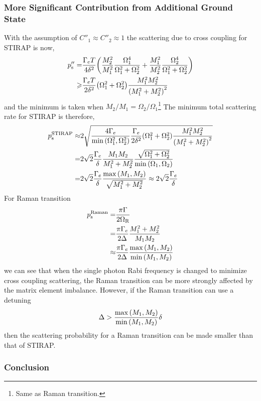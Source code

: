 \subsubsection{More Significant Contribution from Additional Ground State}
\label{ch:raman-transfer:stirap:raman-vs-stirap:cross-couple}

With the assumption of $C''_1\approx C''_2\approx1$ the scattering due to
cross coupling for STIRAP is now,
\begin{align*}
  p''_{\mathrm{s}}=&\frac{\Gamma_eT}{4\delta^2}{\left({\frac{M_2^2}{M_1^2}\frac{\Omega_1^4}{\Omega_1^2+\Omega_2^2}+\frac{M_1^2}{M_2^2}\frac{\Omega_2^4}{\Omega_1^2+\Omega_2^2}}\right)}\\
  \geqslant&\frac{\Gamma_eT}{2\delta^2}{\left({\Omega_1^2+\Omega_2^2}\right)}\frac{M_1^2M_2^2}{{\left({M_1^2+M_2^2}\right)}^2}
\end{align*}
and the minimum is taken when $M_2/M_1=\Omega_2/\Omega_1$\footnote{Same as Raman transition.}
The minimum total scattering rate for STIRAP is therefore,
\begin{align*}
  p_{\mathrm{s}}^{\mathrm{STIRAP}}\approx&2\sqrt{\frac{4\Gamma_e}{\min{\left({\Omega_1^2, \Omega_2^2}\right)}}\frac{\Gamma_e}{2\delta^2}{\left({\Omega_1^2+\Omega_2^2}\right)}\frac{M_1^2M_2^2}{{\left({M_1^2+M_2^2}\right)}^2}}\\
  =&2\sqrt{2}\frac{\Gamma_e}{\delta}\frac{M_1M_2}{M_1^2+M_2^2}\frac{\sqrt{\Omega_1^2+\Omega_2^2}}{\min{\left({\Omega_1, \Omega_2}\right)}}\\
  =&2\sqrt{2}\frac{\Gamma_e}{\delta}\frac{\max{\left({M_1, M_2}\right)}}{\sqrt{M_1^2+M_2^2}}\approx2\sqrt{2}\frac{\Gamma_e}{\delta}
\end{align*}
For Raman transition
\begin{align*}
  p_{\mathrm{s}}^{\mathrm{Raman}}=&\frac{\pi\Gamma}{2\Omega_{\mathrm{R}}}\\
  =&\frac{\pi\Gamma_e}{2\Delta}\frac{M_1^2+M_2^2}{M_1M_2}\\
  \approx&\frac{\pi\Gamma_e}{2\Delta}\frac{\max{\left({M_1,M_2}\right)}}{\min{\left({M_1,M_2}\right)}}
\end{align*}
we can see that when the single photon Rabi frequency is changed to minimize
cross coupling scattering, the Raman transition can be more strongly affected by
the matrix element imbalance. However, if the Raman transition can use a detuning
\[
  \Delta>\frac{\max{\left({M_1,M_2}\right)}}{\min{\left({M_1,M_2}\right)}}\delta
\]
then the scattering probability for a Raman transition can be made smaller than that of STIRAP.

\subsubsection{Conclusion}

